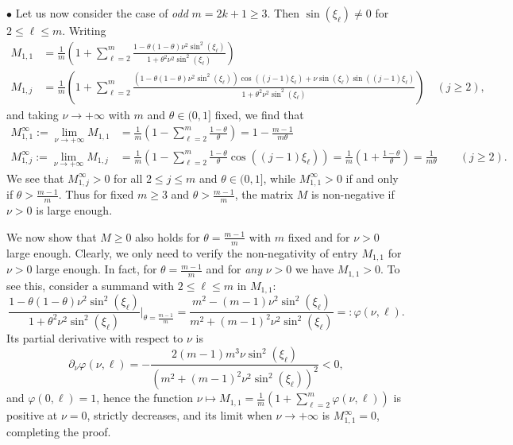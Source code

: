 \documentclass[a4paper]{article}
\newcommand{\te}{\theta}
\begin{document}
$\bullet$ Let us now consider the case of \emph{odd} $m=2k+1\ge 3$. Then $\sin(\xi_\ell)\ne0$ for $2\le\ell\le m$. Writing
\begin{align*} 
    M_{1,1} & = \frac{1}{m} \left(1 + \sum_{\ell=2}^{m} \frac{1-\theta(1-\theta)\nu^2\sin^2(\xi_\ell)}{1+\theta^2\nu^2\sin^2(\xi_\ell)}\right) \\
    M_{1,j} & = \frac{1}{m} \left(1 + \sum_{\ell=2}^{m} \frac{(1-\theta(1-\theta)\nu^2\sin^2(\xi_\ell))\cos((j-1)\xi_\ell)+ \nu \sin(\xi_\ell)\sin((j-1)\xi_\ell)}{1+\theta^2\nu^2 \sin^2(\xi_\ell)}\right) \quad (j\ge 2),
\end{align*}
and taking $\nu \to +\infty$ with $m$ and $\te\in(0,1]$ fixed, we find that
\begin{align*} 
    M_{1,1}^\infty := \lim_{\nu \to +\infty} M_{1,1} & = \frac{1}{m} \left(1 - \sum_{\ell=2}^m \frac{1-\theta}{\theta}\right) =  1-\frac{m-1}{m\theta}\\
    M_{1,j}^\infty := \lim_{\nu \to +\infty} M_{1,j} & = \frac{1}{m} \left(1 - \sum_{\ell=2}^m \frac{1-\theta}{\theta}\cos((j-1)\xi_\ell)\right) = \frac{1}{m} \left(1+\frac{1-\theta}{\theta}\right) = \frac{1}{m\theta} \quad\quad (j\ge 2).
\end{align*}
We see that $M_{1,j}^\infty>0$ for all $2\le j\le m$ and $\te\in(0,1]$, while $M_{1,1}^\infty>0$ if and only if $\theta>\frac{m-1}{m}$. Thus for fixed $m\ge 3$ and $\theta>\frac{m-1}{m}$, the matrix $M$ is non-negative 
if $\nu>0$ is large enough.

We now show that $M\ge 0$ also holds for $\theta=\frac{m-1}{m}$ with $m$ fixed and for $\nu>0$ large enough. Clearly, we only need to verify the non-negativity of entry $M_{1,1}$ for $\nu>0$ large enough. 
In fact, for $\theta=\frac{m-1}{m}$ and for \emph{any} $\nu>0$ we have $M_{1,1}> 0$. To see this, consider a summand with $2\le\ell\le m$ in $M_{1,1}$: 
\[
 \frac{1-\theta(1-\theta)\nu^2\sin^2(\xi_\ell)}{1+\theta^2\nu^2\sin^2(\xi_\ell)}\Big|_{\theta=\frac{m-1}{m}}=
 \frac{m^2-(m-1) \nu ^2 \sin ^2\left(\xi _\ell\right)}{m^2+(m-1)^2 \nu ^2 \sin ^2\left(\xi _\ell\right)}=:\varphi(\nu,\ell).
\]
Its partial derivative with respect to $\nu$ is
\[
\partial_\nu\varphi(\nu,\ell)=-\frac{2 (m-1) m^3 \nu  \sin ^2\left(\xi _\ell\right)}{\left(m^2+(m-1)^2 \nu ^2 \sin ^2\left(\xi _\ell\right)\right)^2}<0,
\]
and $\varphi(0,\ell)=1$, hence the function $\nu\mapsto M_{1,1}=\frac{1}{m} \left(1 + \sum_{\ell=2}^{m} \varphi(\nu,\ell)\right)$ is positive at $\nu=0$, strictly decreases, and its limit when $\nu\to +\infty$ is $M_{1,1}^\infty=0$, completing the proof.\\
\end{document}
